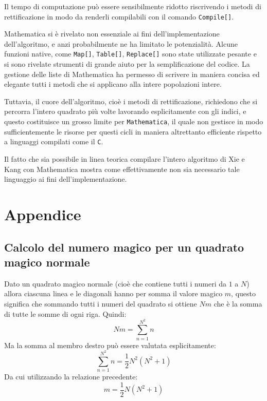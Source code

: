 \documentclass[italian,twoside,twocolumn]{article}
\begin{document}
Il tempo di computazione può essere sensibilmente ridotto riscrivendo i metodi di rettificazione in modo da renderli compilabili con il comando \texttt{Compile[]}.

Mathematica si è rivelato non essenziale ai fini dell'implementazione dell'algoritmo, e anzi probabilmente ne ha limitato le potenzialità. Alcune funzioni native, come \texttt{Map[]}, \texttt{Table[]}, \texttt{Replace[]} sono state utilizzate pesante e si sono rivelate strumenti di grande aiuto per la semplificazione del codice. La gestione delle liste di Mathematica ha permesso di scrivere in maniera concisa ed elegante tutti i metodi che si applicano alla intere popolazioni intere.

Tuttavia, il cuore dell'algoritmo, cioè i metodi di rettificazione, richiedono che si percorra l'intero quadrato più volte lavorando esplicitamente con gli indici, e questo costituisce un grosso limite per \texttt{Mathematica}, il quale non gestisce in modo sufficientemente le risorse per questi cicli in maniera altrettanto efficiente rispetto a linguaggi compilati come il \texttt{C}.

Il fatto che sia possibile in linea teorica compilare l'intero algoritmo di Xie e Kang con Mathematica mostra come effettivamente non sia necessario tale linguaggio ai fini dell'implementazione. 

\section{Appendice}

\subsection{Calcolo del numero magico per un quadrato magico normale}
Dato un quadrato magico normale (cioè che contiene tutti i numeri da $ 1 $ a $ N $) allora ciascuna linea e le diagonali hanno per somma il valore magico $ \mathit{m} $, questo significa che sommando tutti i numeri del quadrato si ottiene $  N \mathit{m} $ che è la somma di tutte le somme di ogni riga. Quindi:
\[  N \mathit{m} = \sum_{n = 1}^{N^2}n		\]
Ma la somma al membro destro può essere valutata esplicitamente:
\[	\sum_{n = 1}^{N^2}n = \frac{1}{2} N^2 (N^2 + 1)	\]
Da cui utilizzando la relazione precedente:
\[	 \mathit{m} = \frac{1}{2} N (N^2 + 1)	\]
\end{document}
